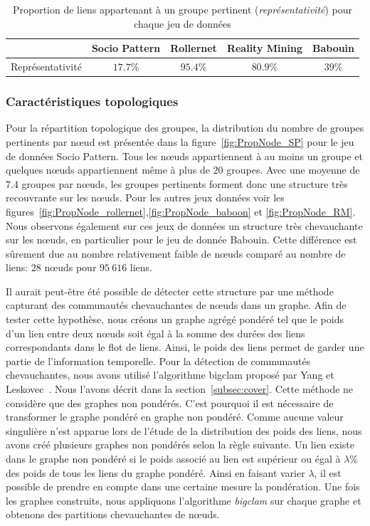 \begin{table}
\centering
\begin{tabular}{|c|c|c|c|c|}
\hline \rule[-1ex]{0pt}{3.5ex}
 & Socio Pattern & Rollernet & Reality Mining & Babouin \\
\hline
Représentativité & $17.7\%$ & $95.4\%$ & $80.9\%$ & $39\%$ \\

\hline
\end{tabular}
\caption{Proportion de liens appartenant à un groupe pertinent (\emph{représentativité}) pour chaque jeu de données}
\label{tab:res_representativite}       %
\end{table}


\subsubsection{Caractéristiques topologiques}
Pour la répartition topologique des groupes, la distribution du nombre de groupes pertinents par n\oe{}ud est présentée dans la figure~\ref{fig:PropNode_SP} pour le jeu de données Socio Pattern.
Tous les n\oe{}uds appartiennent à au moins un groupe et quelques n\oe{}uds appartiennent même à plus de $20$ groupes.
Avec une moyenne de $7.4$ groupes par n\oe{}uds, les groupes pertinents forment donc une structure très recouvrante sur les n\oe{}uds.
Pour les autres jeux données voir les figures~\ref{fig:PropNode_rollernet},\ref{fig:PropNode_baboon} et \ref{fig:PropNode_RM}.
Nous observons également sur ces jeux de données un structure très chevauchante sur les n\oe{}uds, en particulier pour le jeu de donnée Babouin.
Cette différence est sûrement due au nombre relativement faible de n\oe{}uds comparé au nombre de liens: $28$ n\oe{}uds pour $95\ 616$ liens.

\bigskip

Il aurait peut-être été possible de détecter cette structure par une méthode capturant des communautés chevauchantes de n\oe{}uds dans un graphe.
Afin de tester cette hypothèse, nous créons un graphe agrégé pondéré tel que le poids d'un lien entre deux n\oe{}uds soit égal à la somme des durées des liens correspondants dans le flot de liens.
Ainsi, le poids des liens permet de garder une partie de l'information temporelle.
Pour la détection de communautés chevauchantes, nous avons utilisé l'algorithme bigclam proposé par Yang et Leskovec~\cite{Yang2013}.
Nous l'avons décrit dans la section~\ref{subsec:cover}.
Cette méthode ne considère que des graphes non pondérés.
C'est pourquoi il est nécessaire de transformer le graphe pondéré en graphe non pondéré.
Comme aucune valeur singulière n'est apparue lors de l'étude de la distribution des poids des liens, nous avons créé plusieurs graphes non pondérés selon la règle suivante.
Un lien existe dans le graphe non pondéré si le poids associé au lien est supérieur ou égal à $\lambda\%$ des poids de tous les liens du graphe pondéré.
Ainsi en faisant varier $\lambda$, il est possible de prendre en compte dans une certaine mesure la pondération.
Une fois les graphes construits, nous appliquons l'algorithme \emph{bigclam} sur chaque graphe et obtenons des partitions chevauchantes de n\oe{}uds.


